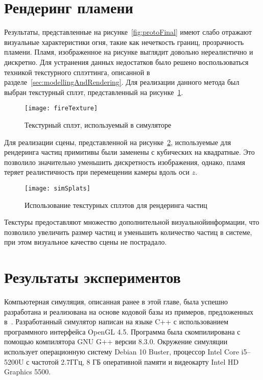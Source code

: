 \section{Рендеринг пламени}

Результаты, представленные на рисунке~\ref{fig:protoFinal} имеют слабо отражают
визуальные характеристики огня, такие как нечеткость границ, прозрачность
пламени. Пламя, изображенное на рисунке выглядит довольно нереалистично и
дискретно. Для устранения данных недостатков было решено воспользоваться
техникой текстурного сплэттинга, описанной в
разделе~\ref{sec:modellingAndRendering}. Для реализации данного метода был
выбран текстурный сплэт, представленный на рисунке~\ref{fig:fireTexture}.

\begin{figure}[htb]
	\centering
    \texttt{[image: fireTexture]}
    \caption{Текстурный сплэт, используемый в симуляторе}%
    \label{fig:fireTexture}
\end{figure}

Для реализации сцены, представленной на рисунке~\ref{fig:protoSplats},
используемые для рендеринга частиц примитивы были заменены с кубических на
квадратные. Это позволило значительно уменьшить дискретность изображения,
однако, пламя теряет реалистичность при перемещении камеры вдоль оси $z$.

\begin{figure}[htb]
	\centering
    \texttt{[image: simSplats]}
    \caption{Использование текстурных сплэтов для рендеринга частиц}%
    \label{fig:protoSplats}
\end{figure}

Текстуры предоставляют множество дополнительной визуальной\break{}информации, что
позволило увеличить размер частиц и уменьшить количество частиц в системе, при
этом визуальное качество сцены не пострадало.

\section{Результаты экспериментов}

Компьютерная симуляция, описанная ранее в этой главе, была
успешно разработана и реализована на основе кодовой базы из примеров,
предложенных в~\cite{LearnOGL}. Разработанный симулятор написан на языке C++ с
использованием программного интерфейса OpenGL 4.5. Программа была скомпилирована
с помощью компилятора GNU G++ версии 8.3.0. Окружение симуляции использует
операционную систему Debian 10 Buster, процессор Intel Core i5--5200U с частотой
2.7ГГц, 8 ГБ оперативной памяти и видеокарту Intel HD Graphics 5500.

